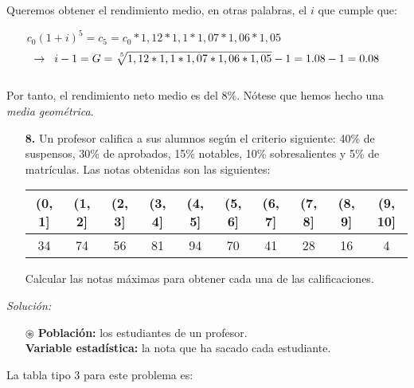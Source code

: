 \documentclass[11pt,a4paper]{article}
\theoremstyle{definition}
\begin{document}
Queremos obtener el rendimiento medio, en otras palabras, el $i$ que cumple que:

$$ c_0(1+i)^5 = c_5 = c_0*1,12*1,1*1,07*1,06*1,05 \hspace{4cm} $$
$$ \rightarrow \hspace{0.2cm} i-1=G= \sqrt[\leftroot{-2}\uproot{2}{5}]{1,12*1,1*1,07*1,06*1,05}- 1 = 1.08-1 = 0.08 $$
\\
Por tanto, el rendimiento neto medio es del $8\%$. Nótese que hemos hecho una \emph{media geométrica}.




\pagebreak

\begin{itemize}
	\item[\textbf{8.}] Un profesor califica a sus alumnos según el criterio siguiente: 40\% de suspensos, 30\% de aprobados, 15\% notables, 10\% sobresalientes y 5\% de matrículas. Las notas obtenidas son las siguientes:


\begin{table}[!htbp]
\hspace{1.5cm}
\begin{tabular}{|c|c|c|c|c|c|c|c|c|c|}
\hline
(0, 1] & (1, 2] & (2, 3] & (3, 4] & (4, 5] & (5, 6] & (6, 7] & (7, 8] & (8, 9] & (9, 10] \\ \hline
34 & 74 & 56 & 81 & 94 & 70 & 41 & 28 & 16 & 4 \\ \hline
\end{tabular}
\end{table}
	Calcular las notas máximas para obtener cada una de las calificaciones.
\end{itemize}

{\color{grey}\hrulefill}

\emph{Solución:}

\begin{itemize}
	\item[$\circledast$] \textbf{Población:} los estudiantes de un profesor. \\ \textbf{Variable estadística:} la nota que ha sacado cada estudiante.
\end{itemize}

La tabla tipo 3 para este problema es:
\end{document}
